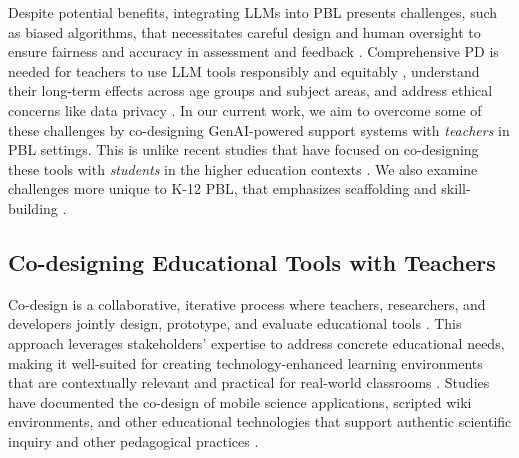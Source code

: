 Despite potential benefits, integrating LLMs into PBL presents challenges, such as biased algorithms, that necessitates careful design and human oversight to ensure fairness and accuracy in assessment and feedback \cite{schneider2023towards}. Comprehensive PD is needed for teachers to use LLM tools responsibly and equitably \cite{lan2024teachers, askarbekuly2024llm}, understand
their long-term effects across age groups and subject areas, and address ethical concerns like data privacy \cite{asrifan2024integrating, wang2024artificial, zha2024designing}. In our current work, we aim to overcome some of these challenges by co-designing GenAI-powered support systems with \textit{teachers} in PBL settings. {
This is unlike recent studies that have focused on co-designing these tools with \textit{students} in the higher education contexts \cite{zheng2024selfgauge, zheng2024charting, nikolicsupporting, gustafson2025enhancing}. We also examine challenges more unique to K-12 PBL, that emphasizes scaffolding and skill-building \cite{condliffe2017project}.} 

\subsection{Co-designing Educational Tools with Teachers}

Co-design is a collaborative, iterative process where teachers, researchers, and developers jointly design, prototype, and evaluate educational tools %
\cite{roschelle2006co}. This approach leverages stakeholders' expertise to address concrete educational needs, making it well-suited for creating technology-enhanced learning environments that are contextually relevant and practical for real-world classrooms \cite{cober2015teachers, brown1992design, lingnau2007empowering}. Studies have documented the co-design of mobile science applications, scripted wiki environments, and other educational technologies that support authentic scientific inquiry and other pedagogical practices \cite{spikol2009integrating, zhang2010deconstructing, peters2009co, cober2015teachers}.

